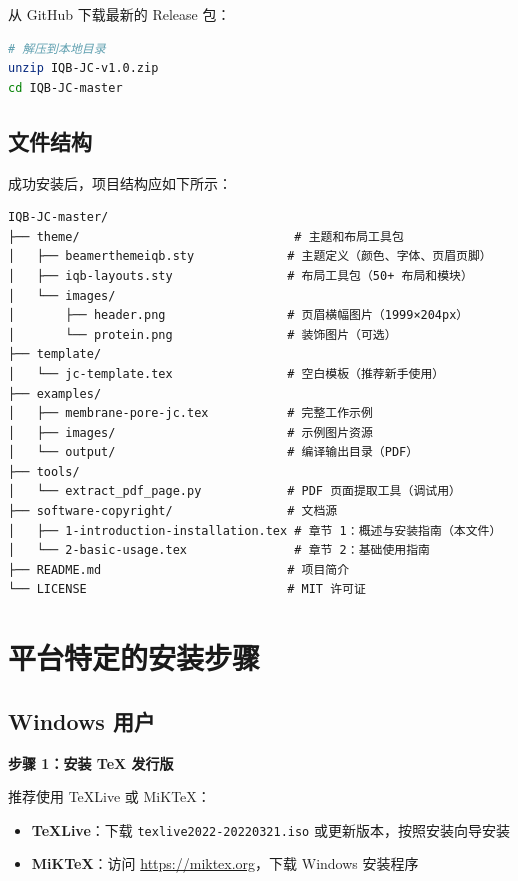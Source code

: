 从 GitHub 下载最新的 Release 包：

\begin{lstlisting}[style=blockstyle,language=bash]
# 解压到本地目录
unzip IQB-JC-v1.0.zip
cd IQB-JC-master
\end{lstlisting}

\subsection{文件结构}

成功安装后，项目结构应如下所示：

\begin{lstlisting}[style=blockstyle]
IQB-JC-master/
├── theme/                              # 主题和布局工具包
│   ├── beamerthemeiqb.sty             # 主题定义（颜色、字体、页眉页脚）
│   ├── iqb-layouts.sty                # 布局工具包（50+ 布局和模块）
│   └── images/
│       ├── header.png                 # 页眉横幅图片（1999×204px）
│       └── protein.png                # 装饰图片（可选）
├── template/
│   └── jc-template.tex                # 空白模板（推荐新手使用）
├── examples/
│   ├── membrane-pore-jc.tex           # 完整工作示例
│   ├── images/                        # 示例图片资源
│   └── output/                        # 编译输出目录（PDF）
├── tools/
│   └── extract_pdf_page.py            # PDF 页面提取工具（调试用）
├── software-copyright/                # 文档源
│   ├── 1-introduction-installation.tex # 章节 1：概述与安装指南（本文件）
│   └── 2-basic-usage.tex               # 章节 2：基础使用指南
├── README.md                          # 项目简介
└── LICENSE                            # MIT 许可证
\end{lstlisting}

\section{平台特定的安装步骤}

\subsection{Windows 用户}

\textbf{步骤 1：安装 TeX 发行版}

推荐使用 TeXLive 或 MiKTeX：

\begin{itemize}
    \item \textbf{TeXLive}：下载 \lstinline|texlive2022-20220321.iso| 或更新版本，按照安装向导安装
    \item \textbf{MiKTeX}：访问 \url{https://miktex.org}，下载 Windows 安装程序
\end{itemize}


